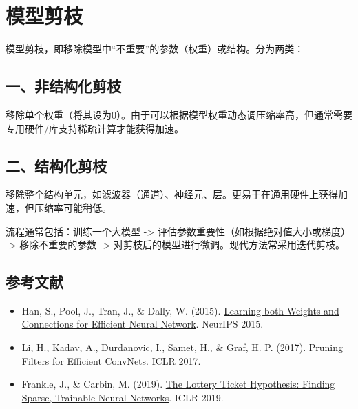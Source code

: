 \setcounter{section}{2}

\hypertarget{ux6a21ux578bux526aux679d}{%
\section{模型剪枝}\label{ux6a21ux578bux526aux679d}}

模型剪枝，即移除模型中``不重要''的参数（权重）或结构。分为两类：

\hypertarget{ux4e00ux975eux7ed3ux6784ux5316ux526aux679d}{%
\subsection{一、非结构化剪枝}\label{ux4e00ux975eux7ed3ux6784ux5316ux526aux679d}}

移除单个权重（将其设为0）。由于可以根据模型权重动态调压缩率高，但通常需要专用硬件/库支持稀疏计算才能获得加速。

\hypertarget{ux4e8cux7ed3ux6784ux5316ux526aux679d}{%
\subsection{二、结构化剪枝}\label{ux4e8cux7ed3ux6784ux5316ux526aux679d}}

移除整个结构单元，如滤波器（通道）、神经元、层。更易于在通用硬件上获得加速，但压缩率可能稍低。

流程通常包括：训练一个大模型 -\textgreater{} 评估参数重要性（如根据绝对值大小或梯度） -\textgreater{} 移除不重要的参数 -\textgreater{} 对剪枝后的模型进行微调。现代方法常采用迭代剪枝。

\FloatBarrier
{}
\hypertarget{ux53c2ux8003ux6587ux732e-90}{%
\subsection{参考文献}\label{ux53c2ux8003ux6587ux732e-90}}

\vspace{0.25em}
\begin{itemize}
\tightlist
\item
  Han, S., Pool, J., Tran, J., \& Dally, W. (2015). \href{https://papers.nips.cc/paper_files/paper/2015/hash/ae0eb3eed39d2bcef4622b2499a05fe6-Abstract.html}{Learning both Weights and Connections for Efficient Neural Network}. NeurIPS 2015.
\item
  Li, H., Kadav, A., Durdanovic, I., Samet, H., \& Graf, H. P. (2017). \href{https://openreview.net/forum?id=rJqFGTslg}{Pruning Filters for Efficient ConvNets}. ICLR 2017.
\item
  Frankle, J., \& Carbin, M. (2019). \href{https://openreview.net/forum?id=rJl-b3RcF7}{The Lottery Ticket Hypothesis: Finding Sparse, Trainable Neural Networks}. ICLR 2019.
\end{itemize}

\clearpage
